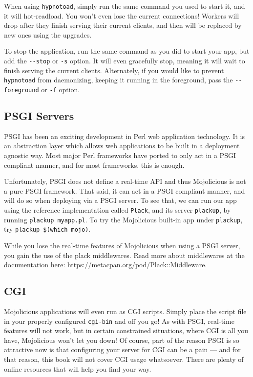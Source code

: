 When using \verb!hypnotoad!, simply run the same command you used to start it, and it will hot-readload.
You won't even lose the current connections!
Workers will drop after they finish serving their current clients, and then will be replaced by new ones using the upgrades.

To stop the application, run the same command as you did to start your app, but add the \verb!--stop! or \verb!-s! option.
It will even gracefully stop, meaning it will wait to finish serving the current clients.
Alternately, if you would like to prevent \verb!hypnotoad! from daemonizing, 
keeping it running in the foreground, pass the \verb!--foreground! or \verb!-f! option.


\subsection{PSGI Servers}

PSGI has been an exciting development in Perl web application technology.
It is an abstraction layer which allows web applications to be built in a deployment agnostic way.
Most major Perl frameworks have ported to only act in a PSGI compliant manner, and for most frameworks, this is enough.

Unfortunately, PSGI does not define a real-time API and thus Mojolicious is not a pure PSGI framework.
That said, it can act in a PSGI compliant manner, and will do so when deploying via a PSGI server.
To see that, we can run our app using the reference implementation called \verb!Plack!, and its server \verb!plackup!, by running \verb!plackup myapp.pl!.
To try the Mojolicious built-in app under \verb!plackup!, try \verb!plackup $(which mojo)!.

While you lose the real-time features of Mojolicious when using a PSGI server, you gain the use of the plack middlewares.
Read more about middlewares at the documentation here: \url{https://metacpan.org/pod/Plack::Middleware}.

\subsection{CGI}

Mojolicious applications will even run as CGI scripts.
Simply place the script file in your properly configured \verb!cgi-bin! and off you go!
As with PSGI, real-time features will not work, but in certain constrained situations, where CGI is all you have, Mojolicious won't let you down!
Of course, part of the reason PSGI is so attractive now is that configuring your server for CGI can be a pain ---
and for that reason, this book will not cover CGI usage whatsoever.
There are plenty of online resources that will help you find your way.

